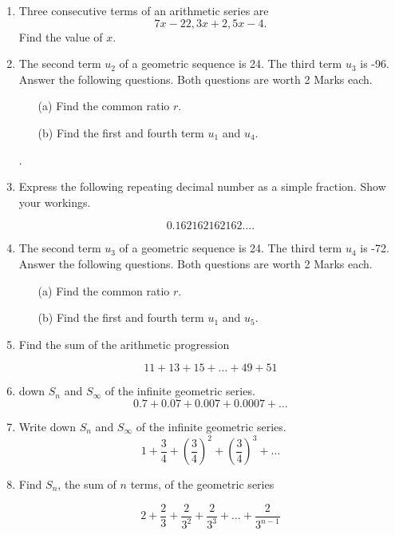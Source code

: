 \documentclass[a4paper,12pt]{article}
\begin{document}
\begin{enumerate}
	\item 	Three consecutive terms of an arithmetic series are \[7x-22, 3x+2 , 5x-4. \]
	Find the value of $x$.
	
	\item 
	The second term $u_2$ of a geometric sequence is 24. The third term $u_3$ is -96. \\ \bigskip Answer the following questions. Both questions are worth 2 Marks each.
	\begin{itemize}
		\item[(a)] Find the common ratio $r$. 
		\item[(b)] Find the first and fourth term $u_1$ and $u_4$.
	\end{itemize}
 .




		
	\item Express the following repeating decimal number as a simple fraction. Show your workings.
	
	\[0.162162162162....\]


	\item 
	The second term $u_3$ of a geometric sequence is 24. The third term $u_4$ is -72. \\  Answer the following questions. Both questions are worth 2 Marks each.
	\begin{itemize}
		\item[(a)] Find the common ratio $r$. 
		\item[(b)] Find the first and fourth term $u_1$ and $u_5$.
	\end{itemize}
\item Find the sum of the arithmetic progression
{

\[ 11 + 13 + 15 + \dots + 49 + 51 \]
}

\item down $S_n$ and $S_{\infty}$ of the infinite geometric series.
\[ 0.7 + 0.07 + 0.007 + 0.0007 + \ldots  \]


\item Write down $S_n$ and $S_{\infty}$ of the infinite geometric series.
\[ 1 + \frac{3}{4} + \left( \frac{3}{4} \right)^2 + \left( \frac{3}{4} \right)^3 + \ldots  \]



\item Find $S_n$, the sum of $n$ terms, of the geometric series

\[  2 + \frac{2}{3} + \frac{2}{3^2} + \frac{2}{3^3} +  \ldots + \frac{2}{3^{n-1}} \]


\end{enumerate}
\end{document}
